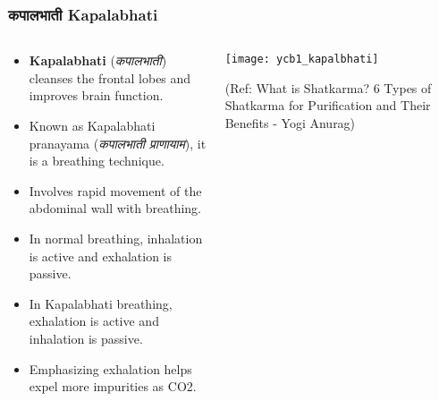 \begin{frame}[fragile]\frametitle{कपालभाती Kapalabhati}
\begin{columns}
    \begin{column}[T]{0.5\linewidth}
      \begin{itemize}
          \item \textbf{Kapalabhati} (\textit{कपालभाती}) cleanses the frontal lobes and improves brain function.
          \item Known as Kapalabhati pranayama (\textit{कपालभाती प्राणायाम}), it is a breathing technique.
          \item Involves rapid movement of the abdominal wall with breathing.
          \item In normal breathing, inhalation is active and exhalation is passive.
          \item In Kapalabhati breathing, exhalation is active and inhalation is passive.
          \item Emphasizing exhalation helps expel more impurities as CO2.
      \end{itemize}
    \end{column}
    \begin{column}[T]{0.5\linewidth}
        \begin{center}
        \texttt{[image: ycb1\_kapalbhati]}
		
		{\tiny (Ref: What is Shatkarma? 6 Types of Shatkarma for Purification and Their Benefits - Yogi Anurag)}	
        \end{center}	
    \end{column}
\end{columns}
\end{frame}


